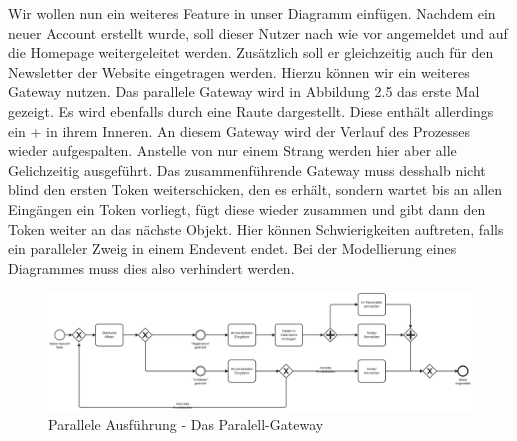 Wir wollen nun ein weiteres Feature in unser Diagramm einfügen. Nachdem ein neuer Account erstellt wurde, soll dieser Nutzer nach wie vor angemeldet und auf die Homepage weitergeleitet werden. Zusätzlich soll er gleichzeitig auch für den Newsletter der Website eingetragen werden. Hierzu können wir ein weiteres Gateway nutzen. Das parallele Gateway wird in Abbildung 2.5 das erste Mal gezeigt. Es wird ebenfalls durch eine Raute dargestellt. Diese enthält allerdings ein + in ihrem Inneren. An diesem Gateway wird der Verlauf des Prozesses wieder aufgespalten. Anstelle von nur einem Strang werden hier aber alle Gelichzeitig ausgeführt. Das zusammenführende Gateway muss desshalb nicht blind den ersten Token weiterschicken, den es erhält, sondern wartet bis an allen Eingängen ein Token vorliegt, fügt diese wieder zusammen und gibt dann den Token weiter an das nächste Objekt. Hier können Schwierigkeiten auftreten, falls ein paralleler Zweig in einem Endevent endet. Bei der Modellierung eines Diagrammes muss dies also verhindert werden. 
\begin{figure}
\centering
\includegraphics[width=15cm]{Figures/Beispiel6}
\decoRule
\caption[Paralell-Gateway]{Parallele Ausführung - Das Paralell-Gateway}
\label{fig:Task}
\end{figure}







